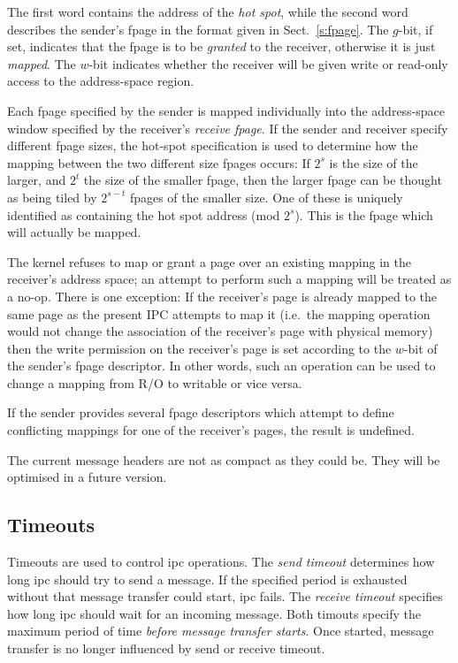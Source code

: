 \documentclass[a4paper,11pt,twoside,dvips]{book}
\newcommand{\impnote}[1]{\framebox{\textbf{MIPS Implementation Note:}} #1}
\begin{document}
The first word contains the address of the \emph{hot spot}, while the
second word describes the sender's fpage in the format given in
Sect.~\ref{s:fpage}. The \(g\)-bit, if set, indicates that the fpage is
to be \emph{granted} to the receiver, otherwise it is just
\emph{mapped}. The \(w\)-bit indicates whether the receiver will be
given write or read-only access to the address-space region.

Each fpage specified by the sender is mapped individually into the
address-space window specified by the receiver's \emph{receive
fpage}. If the sender and receiver specify different fpage sizes, the
hot-spot specification is used to determine how the mapping between the
two different size fpages occurs: If \(2^s\) is the size of the larger,
and \(2^t\) the size of the smaller fpage, then the larger fpage can be
thought as being tiled by \(2^{s-t}\) fpages of the smaller size. One of
these is uniquely identified as containing the hot spot address
(mod \(2^s\)). This is the fpage which will actually be mapped.  

\cbstart The kernel refuses to map or grant a page over an existing
mapping in the receiver's address space; an attempt to perform such a
mapping will be treated as a no-op. There is one exception: If the
receiver's page is already mapped to the same page as the present IPC
attempts to map it (i.e.\ the mapping operation would not change the
association of the receiver's page with physical memory) then the write
permission on the receiver's page is set according to the \(w\)-bit of
the sender's fpage descriptor. In other words, such an operation can be
used to change a mapping from R/O to writable or vice versa.

If the sender provides several fpage descriptors which attempt to define
conflicting mappings for one of the receiver's pages, the result is
undefined.  \cbend

\impnote{The current message headers are not as compact as they could
  be. They will be optimised in a future version.} 
 



\subsection{Timeouts}                        \label{timeouts} 
 
Timeouts are used to control ipc operations. The {\em send timeout}
determines how long ipc should try to send a message. If the specified
period is exhausted without that message transfer could start, ipc fails.
The {\em receive timeout} specifies how long ipc should wait for an incoming
message. Both timouts specify the maximum period of time {\em before message
transfer starts}. Once started, message transfer is no longer influenced by
send or receive timeout. 
 
\end{document}
